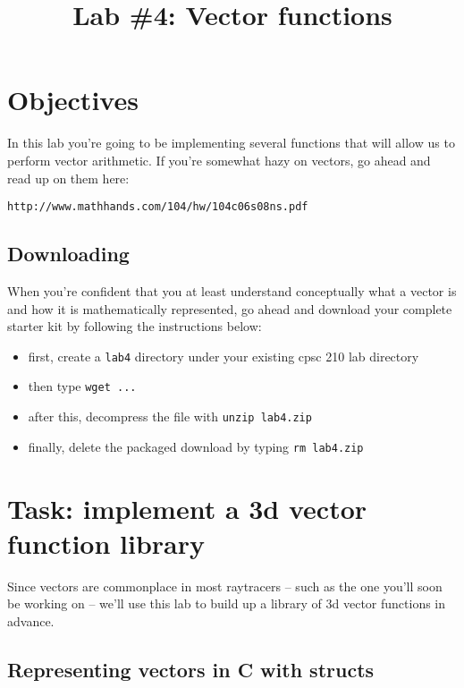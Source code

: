 \documentclass[12pt]{article}
\begin{document}
\title{\vspace{-.35in}Lab \#4: Vector functions}
\date{\empty}
\maketitle

\pagestyle{fancy}
\thispagestyle{fancy}

\vspace{-.75in}
\section{Objectives}
In this lab you're going to be implementing several functions that will allow us to perform vector arithmetic. If you're somewhat hazy on vectors, go ahead and read up on them here:
\begin{center}
\texttt{http://www.mathhands.com/104/hw/104c06s08ns.pdf}
\end{center}

\subsection{Downloading}

When you're confident that you at least understand conceptually what a vector is and how it is mathematically represented, go ahead and download your complete starter kit by following the instructions below:

\begin{itemize}
\item first, create a \texttt{lab4} directory under your existing cpsc 210 lab directory 
\item then type \texttt{wget ...}
\item after this, decompress the file with \texttt{unzip lab4.zip}
\item finally, delete the packaged download by typing \texttt{rm lab4.zip}
\end{itemize}

\section{Task: implement a 3d vector function library}

Since vectors are commonplace in most raytracers -- such as the one you'll soon be working on -- we'll use this lab to build up a library of 3d vector functions in advance. 

\subsection{Representing vectors in C with structs}
\end{document}
